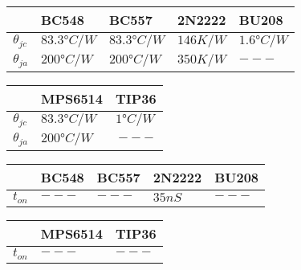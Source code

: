 \begin{center}
\begin{tabular}{|l|l|l|l|l|}
\hline
\rowcolor[HTML]{FFFFC7} 
                                                & \textbf{BC548} & \textbf{BC557} & \textbf{2N2222} & \textbf{BU208} \\ \hline
\cellcolor[HTML]{FFCCC9}\textbf{$\theta _{jc}$} &   $83.3°C/W$   &  $83.3°C/W$    &    $146K/W$     &    $1.6°C/W$          \\ \hline
\cellcolor[HTML]{FFCCC9}\textbf{$\theta _{ja}$} &   $200°C/W$    &  $200°C/W$     &   $350K/W$      &       $---$         \\ \hline
\end{tabular}
\end{center}
\begin{center}
\begin{tabular}{|l|l|l|}
\hline
\rowcolor[HTML]{FFFFC7} 
                                                & \textbf{MPS6514} & \textbf{TIP36} \\ \hline
\cellcolor[HTML]{FFCCC9}\textbf{$\theta _{jc}$} &   $83.3°C/W$     &      $1°C/W$          \\ \hline
\cellcolor[HTML]{FFCCC9}\textbf{$\theta _{ja}$} &   $200°C/W$      &       $$---$$                \\ \hline
\end{tabular}
\end{center}



\begin{center}
\begin{tabular}{|l|l|l|l|l|}
\hline
\rowcolor[HTML]{FFFFC7} 
                                           & \textbf{BC548} & \textbf{BC557} & \textbf{2N2222} & \textbf{BU208} \\ \hline
\cellcolor[HTML]{FFCCC9}\textbf{$t _{on}$} &       $---$      &      $---$       &       $35nS$    &$---$\\ \hline
\end{tabular}
\end{center}
\begin{center}
\begin{tabular}{|l|l|l|}
\hline
\rowcolor[HTML]{FFFFC7} 
                                          & \textbf{MPS6514} & \textbf{TIP36} \\ \hline
\cellcolor[HTML]{FFCCC9}\textbf{$t_{on}$} &        $---$          &      $---$          \\ \hline
\end{tabular}
\end{center}


